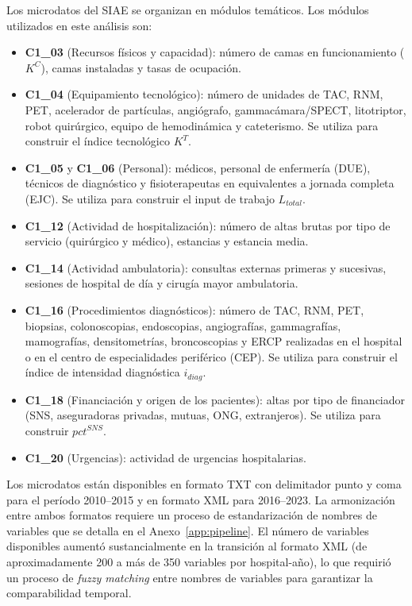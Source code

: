 \documentclass[12pt, a4paper, twoside, openright]{book}
\theoremstyle{plain}
\theoremstyle{definition}
\theoremstyle{remark}
\begin{document}
Los microdatos del SIAE se organizan en módulos temáticos. Los módulos utilizados en este análisis son:

\begin{itemize}
  \item \textbf{C1\_03} (Recursos físicos y capacidad): número de camas en funcionamiento ($K^C$), camas instaladas y tasas de ocupación.
  \item \textbf{C1\_04} (Equipamiento tecnológico): número de unidades de TAC, RNM, PET, acelerador de partículas, angiógrafo, gammacámara/SPECT, litotriptor, robot quirúrgico, equipo de hemodinámica y cateterismo. Se utiliza para construir el índice tecnológico $K^T$.
  \item \textbf{C1\_05} y \textbf{C1\_06} (Personal): médicos, personal de enfermería (DUE), técnicos de diagnóstico y fisioterapeutas en equivalentes a jornada completa (EJC). Se utiliza para construir el input de trabajo $L_{total}$.
  \item \textbf{C1\_12} (Actividad de hospitalización): número de altas brutas por tipo de servicio (quirúrgico y médico), estancias y estancia media.
  \item \textbf{C1\_14} (Actividad ambulatoria): consultas externas primeras y sucesivas, sesiones de hospital de día y cirugía mayor ambulatoria.
  \item \textbf{C1\_16} (Procedimientos diagnósticos): número de TAC, RNM, PET, biopsias, colonoscopias, endoscopias, angiografías, gammagrafías, mamografías, densitometrías, broncoscopias y ERCP realizadas en el hospital o en el centro de especialidades periférico (CEP). Se utiliza para construir el índice de intensidad diagnóstica $i_{diag}$.
  \item \textbf{C1\_18} (Financiación y origen de los pacientes): altas por tipo de financiador (SNS, aseguradoras privadas, mutuas, ONG, extranjeros). Se utiliza para construir $pct^{SNS}$.
  \item \textbf{C1\_20} (Urgencias): actividad de urgencias hospitalarias.
\end{itemize}

Los microdatos están disponibles en formato TXT con delimitador punto y coma para el período 2010--2015 y en formato XML para 2016--2023. La armonización entre ambos formatos requiere un proceso de estandarización de nombres de variables que se detalla en el Anexo~\ref{app:pipeline}. El número de variables disponibles aumentó sustancialmente en la transición al formato XML (de aproximadamente 200 a más de 350 variables por hospital-año), lo que requirió un proceso de \textit{fuzzy matching} entre nombres de variables para garantizar la comparabilidad temporal.
\end{document}
